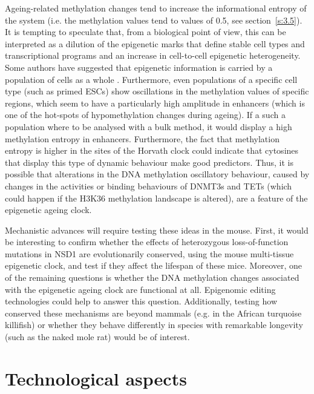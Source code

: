 Ageing-related methylation changes tend to increase the informational entropy of the system (i.e. the methylation values tend to values of 0.5, see section~\ref{s:3.5}). It is tempting to speculate that, from a biological point of view, this can be interpreted as a dilution of the epigenetic marks that define stable cell types and transcriptional programs and an increase in cell-to-cell epigenetic heterogeneity. Some authors have suggested that epigenetic information is carried by a population of cells as a whole \cite{Jenkinson2017,Shipony2014}. Furthermore, even populations of a specific cell type (such as primed \acrshort{ESCs}) show oscillations in the methylation values of specific regions, which seem to have a particularly high amplitude in enhancers \cite{Rulands2018} (which is one of the hot-spots of hypomethylation changes during ageing). If a such a population where to be analysed with a bulk method, it would display a high methylation entropy in enhancers. Furthermore, the fact that methylation entropy is higher in the sites of the Horvath clock could indicate that cytosines that display this type of dynamic behaviour make good predictors. Thus, it is possible that alterations in the DNA methylation oscillatory behaviour, caused by changes in the activities or binding behaviours of DNMT3s and TETs (which could happen if the H3K36 methylation landscape is altered), are a feature of the epigenetic ageing clock.

\bigskip

Mechanistic advances will require testing these ideas in the mouse. First, it would be interesting to confirm whether the effects of heterozygous loss-of-function mutations in NSD1 are evolutionarily conserved, using the mouse multi-tissue epigenetic clock, and test if they affect the lifespan of these mice. Moreover, one of the remaining questions is whether the DNA methylation changes associated with the epigenetic ageing clock are functional at all. Epigenomic editing technologies \cite{Liu2016a} could help to answer this question. Additionally, testing how conserved these mechanisms are beyond mammals (e.g. in the African turquoise killifish) or whether they behave differently in species with remarkable longevity (such as the naked mole rat) would be of interest. 

\smallskip

\section{Technological aspects}

